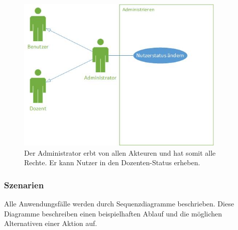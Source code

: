 \documentclass[12pt,a4paper]{article}
\begin{document}
\begin{figure}[H]
	\centering
	\includegraphics[width=10cm]{Bilder/Anwendungsfalldiagramme/Admin.jpg}
	\caption{Der Administrator erbt von allen Akteuren und hat somit alle Rechte. Er kann Nutzer in den Dozenten-Status erheben.}
	\label{AwfAdmin}
\end{figure}

\newpage

\subsubsection{Szenarien}
Alle Anwendungsfälle werden durch Sequenzdiagramme beschrieben. Diese Diagramme beschreiben einen beispielhaften Ablauf und die möglichen Alternativen einer Aktion auf.
\end{document}
